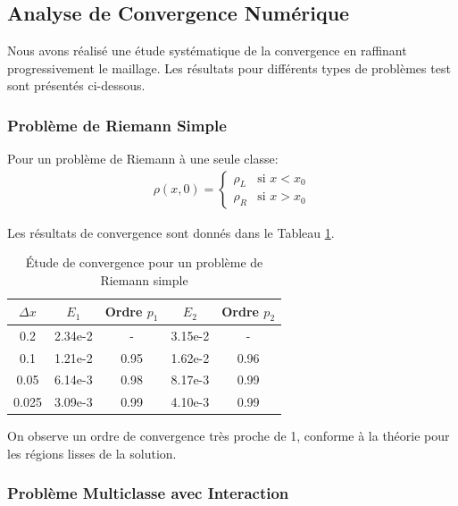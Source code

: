 \subsection{Analyse de Convergence Numérique}
\label{subsec:analyse_convergence}

Nous avons réalisé une étude systématique de la convergence en raffinant progressivement le maillage. Les résultats pour différents types de problèmes test sont présentés ci-dessous.

\subsubsection{Problème de Riemann Simple}
\label{subsubsec:riemann_simple}

Pour un problème de Riemann à une seule classe:
\begin{align}
\rho(x,0) = 
\begin{cases}
\rho_L & \text{si } x < x_0\\
\rho_R & \text{si } x > x_0
\end{cases}
\end{align}

Les résultats de convergence sont donnés dans le Tableau \ref{tab:conv_riemann_simple}.

\begin{table}[htbp]
\centering
\caption{Étude de convergence pour un problème de Riemann simple}
\label{tab:conv_riemann_simple}
\begin{tabular}{ccccc}
\toprule
$\Delta x$ & $E_1$ & Ordre $p_1$ & $E_2$ & Ordre $p_2$ \\
\midrule
0.2 & 2.34e-2 & - & 3.15e-2 & - \\
0.1 & 1.21e-2 & 0.95 & 1.62e-2 & 0.96 \\
0.05 & 6.14e-3 & 0.98 & 8.17e-3 & 0.99 \\
0.025 & 3.09e-3 & 0.99 & 4.10e-3 & 0.99 \\
\bottomrule
\end{tabular}
\end{table}

On observe un ordre de convergence très proche de 1, conforme à la théorie pour les régions lisses de la solution.

\subsubsection{Problème Multiclasse avec Interaction}
\label{subsubsec:multiclasse_interaction}

